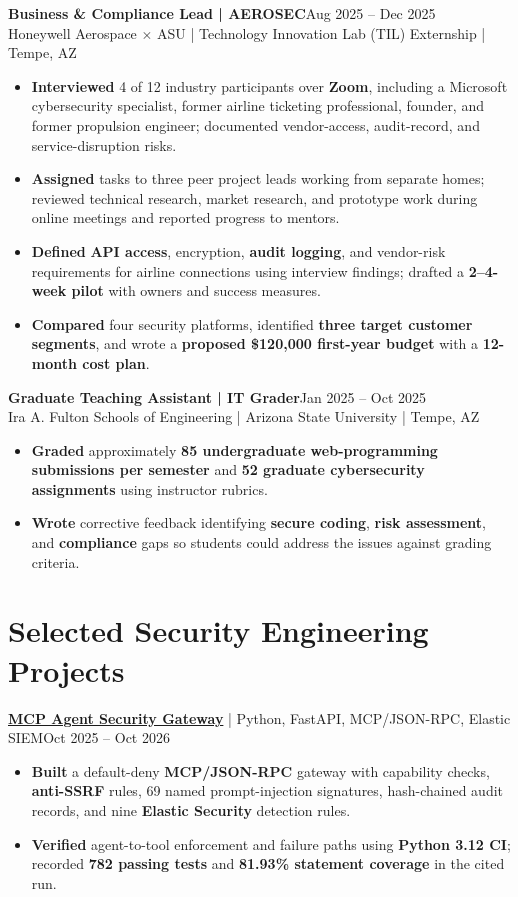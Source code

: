 \documentclass[letterpaper,10pt]{article}
\newcommand{\job}[3]{\textbf{#1}\hfill{\fontsize{10.8}{12.6}\selectfont #2}\\{\fontsize{10.5}{12.4}\selectfont #3}\vspace{2pt}}
\newcommand{\proj}[3]{\textbf{#1} {\fontsize{10.5}{12.4}\selectfont | #2}\hfill{\fontsize{10.5}{12.4}\selectfont #3}\vspace{2pt}}
\begin{document}
\job{Business \& Compliance Lead | AEROSEC}{Aug 2025 -- Dec 2025}{Honeywell Aerospace $\times$ ASU | Technology Innovation Lab (TIL) Externship | Tempe, AZ}
\begin{itemize}
\item \textbf{Interviewed} 4 of 12 industry participants over \textbf{Zoom}, including a Microsoft cybersecurity specialist, former airline ticketing professional, founder, and former propulsion engineer; documented vendor-access, audit-record, and service-disruption risks.
\item \textbf{Assigned} tasks to three peer project leads working from separate homes; reviewed technical research, market research, and prototype work during online meetings and reported progress to mentors.
\item \textbf{Defined} \textbf{API access}, encryption, \textbf{audit logging}, and vendor-risk requirements for airline connections using interview findings; drafted a \textbf{2--4-week pilot} with owners and success measures.
\item \textbf{Compared} four security platforms, identified \textbf{three target customer segments}, and wrote a \textbf{proposed \$120,000 first-year budget} with a \textbf{12-month cost plan}.
\end{itemize}

\job{Graduate Teaching Assistant | IT Grader}{Jan 2025 -- Oct 2025}{Ira A. Fulton Schools of Engineering | Arizona State University | Tempe, AZ}
\begin{itemize}
\item \textbf{Graded} approximately \textbf{85 undergraduate web-programming submissions per semester} and \textbf{52 graduate cybersecurity assignments} using instructor rubrics.
\item \textbf{Wrote} corrective feedback identifying \textbf{secure coding}, \textbf{risk assessment}, and \textbf{compliance} gaps so students could address the issues against grading criteria.
\end{itemize}

\section{Selected Security Engineering Projects}
\proj{\href{https://github.com/poojakira/mcp-agent-security-gateway}{MCP Agent Security Gateway}}{Python, FastAPI, MCP/JSON-RPC, Elastic SIEM}{Oct 2025 -- Oct 2026}
\begin{itemize}
\item \textbf{Built} a default-deny \textbf{MCP/JSON-RPC} gateway with capability checks, \textbf{anti-SSRF} rules, 69 named prompt-injection signatures, hash-chained audit records, and nine \textbf{Elastic Security} detection rules.
\item \textbf{Verified} agent-to-tool enforcement and failure paths using \textbf{Python 3.12 CI}; recorded \textbf{782 passing tests} and \textbf{81.93\% statement coverage} in the cited run.
\end{itemize}
\end{document}
